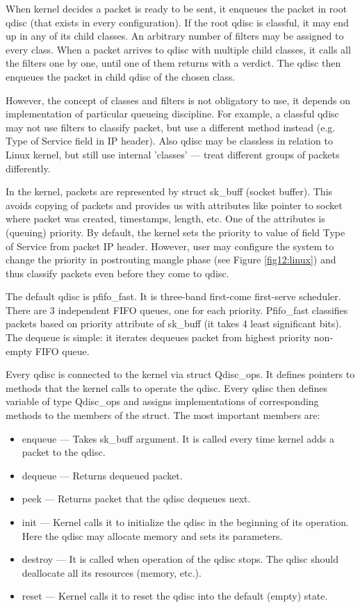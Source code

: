 When kernel decides a packet is ready to be sent, it enqueues the packet in root qdisc (that exists in every configuration). If the root qdisc is classful, it may end up in any of its child classes. An arbitrary number of filters may be assigned to every class. When a packet arrives to qdisc with multiple child classes, it calls all the filters one by one, until one of them returns with a verdict. The qdisc then enqueues the packet in child qdisc of the chosen class.

However, the concept of classes and filters is not obligatory to use, it depends on implementation of particular queueing discipline. For example, a classful qdisc may not use filters to classify packet, but use a different method instead (e.g. Type of Service field in IP header). Also qdisc may be classless in relation to Linux kernel, but still use internal 'classes' --- treat different groups of packets differently.

In the kernel, packets are represented by struct sk\_buff (socket buffer). This avoids copying of packets and provides us with attributes like pointer to socket where packet was created, timestamps, length, etc. One of the attributes is (queuing) priority. By default, the kernel sets the priority to value of field Type of Service from packet IP header. However, user may configure the system to change the priority in postrouting mangle phase (see Figure \ref{fig12:linux}) and thus classify packets even before they come to qdisc.

The default qdisc is pfifo\_fast. It is three-band first-come first-serve scheduler. There are 3 independent FIFO queues, one for each priority. Pfifo\_fast classifies packets based on priority attribute of sk\_buff (it takes 4 least significant bits). The dequeue is simple: it iterates dequeues packet from highest priority non-empty FIFO queue.

Every qdisc is connected to the kernel via struct Qdisc\_ops. It defines pointers to methods that the kernel calls to operate the qdisc. Every qdisc then defines variable of type Qdisc\_ops and assigns implementations of corresponding methods to the members of the struct. The most important members are:
\begin{itemize}
	\item enqueue --- Takes sk\_buff argument. It is called every time kernel adds a packet to the qdisc.
	\item dequeue --- Returns dequeued packet.
	\item peek --- Returns packet that the qdisc dequeues next.
	\item init --- Kernel calls it to initialize the qdisc in the beginning of its operation. Here the qdisc may allocate memory and sets its parameters.
	\item destroy --- It is called when operation of the qdisc stops. The qdisc should deallocate all its resources (memory, etc.).
	\item reset --- Kernel calls it to reset the qdisc into the default (empty) state.
\end{itemize}

